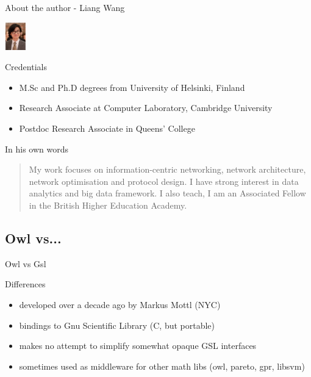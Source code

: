 \documentclass{beamer}
\begin{document}
\begin{frame}{About the author - Liang Wang}
\begin{center}
 \includegraphics[height=45px, width=35px, bb=14 14 120 150]{./liang_wang_smaller.eps}
\end{center}

\begin{block}{Credentials}
\begin{itemize}
\item M.Sc and Ph.D degrees from University of Helsinki, Finland
\item Research Associate at Computer Laboratory, Cambridge University
\item Postdoc Research Associate in Queens' College
\end{itemize}
\end{block}
\pause

\begin{block}{In his own words}
\begin{quotation}
My work focuses on information-centric networking, network architecture, network optimisation and protocol design. 
I have strong interest in data analytics and big data framework. I also teach, I am an Associated Fellow in the British Higher Education Academy.
\end{quotation}
\end{block}
\end{frame}

\subsection{Owl vs...}

\begin{frame}{Owl vs Gsl}
\begin{block}{Differences}
\begin{itemize}
 \item developed over a decade ago by Markus Mottl (NYC) 
 \item bindings to Gnu Scientific Library (C, but portable)
 \item makes no attempt to simplify somewhat opaque GSL interfaces
 \item sometimes used as middleware for other math libs (owl, pareto, gpr, libsvm)
\end{itemize}
\end{block}
\end{frame}
\end{document}
